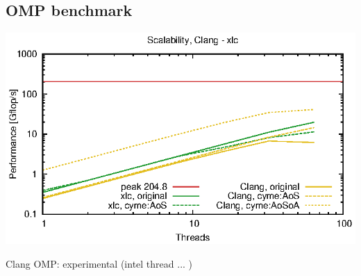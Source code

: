 \documentclass{beamer}
\begin{document}
%

\subsection*{OMP benchmark}
\begin{frame}[fragile]
\begin{center}

   \includegraphics[scale=0.8]{benchgfsc.eps}

Clang OMP: experimental (intel thread ... )
\end{center}
\end{frame}
\end{document}
